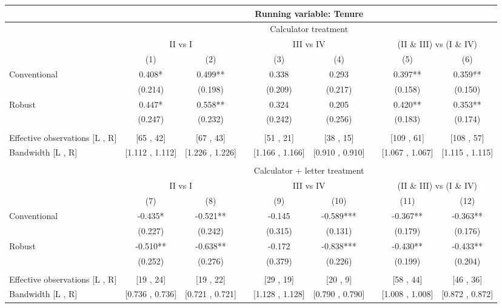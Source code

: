 \begin{tabular}{lcccccccc}
\toprule
      & \multicolumn{8}{c}{Running variable: Tenure} \\
\midrule
      & \multicolumn{8}{c}{Calculator treatment} \\
\midrule
      & \multicolumn{2}{c}{II vs I} &       & \multicolumn{2}{c}{III vs IV} &       & \multicolumn{2}{c}{(II \& III) vs (I \& IV)} \\
\cmidrule{2-3}\cmidrule{5-6}\cmidrule{8-9}      & (1)   & (2)   &       & (3)   & (4)   &       & (5)   & (6) \\
\midrule
\midrule
Conventional & 0.408* & 0.499** &       & 0.338 & 0.293 &       & 0.397** & 0.359** \\
      & (0.214) & (0.198) &       & (0.209) & (0.217) &       & (0.158) & (0.150) \\
Robust & 0.447* & 0.558** &       & 0.324 & 0.205 &       & 0.420** & 0.353** \\
      & (0.247) & (0.232) &       & (0.242) & (0.256) &       & (0.183) & (0.174) \\
      &       &       &       &       &       &       &       &  \\
\midrule
Effective observations [L , R] & [65 ,  42] & [67 ,  43] &       & [51 ,  21] & [38 ,  15] &       & [109 ,  61] & [108 ,  57] \\
Bandwidth [L , R] & [1.112 ,  1.112] & [1.226 ,  1.226] &       & [1.166 ,  1.166] & [0.910 ,  0.910] &       & [1.067 ,  1.067] & [1.115 ,  1.115] \\
\midrule
\midrule
      &       &       &       &       &       &       &       &  \\
\midrule
      & \multicolumn{8}{c}{Calculator + letter treatment} \\
\midrule
      & \multicolumn{2}{c}{II vs I} &       & \multicolumn{2}{c}{III vs IV} &       & \multicolumn{2}{c}{(II \& III) vs (I \& IV)} \\
\cmidrule{2-3}\cmidrule{5-6}\cmidrule{8-9}      & (7)   & (8)   &       & (9)   & (10)  &       & (11)  & (12) \\
\midrule
\midrule
Conventional & -0.435* & -0.521** &       & -0.145 & -0.589*** &       & -0.367** & -0.363** \\
      & (0.227) & (0.242) &       & (0.315) & (0.131) &       & (0.179) & (0.176) \\
Robust & -0.510** & -0.638** &       & -0.172 & -0.838*** &       & -0.430** & -0.433** \\
      & (0.252) & (0.276) &       & (0.379) & (0.226) &       & (0.199) & (0.204) \\
      &       &       &       &       &       &       &       &  \\
\midrule
Effective observations [L , R] & [19 ,  24] & [19 ,  22] &       & [29 ,  19] & [20 ,  9] &       & [58 ,  44] & [46 ,  36] \\
Bandwidth [L , R] & [0.736 ,  0.736] & [0.721 ,  0.721] &       & [1.128 ,  1.128] & [0.790 ,  0.790] &       & [1.008 ,  1.008] & [0.872 ,  0.872] \\
\bottomrule
\bottomrule
\end{tabular}%
